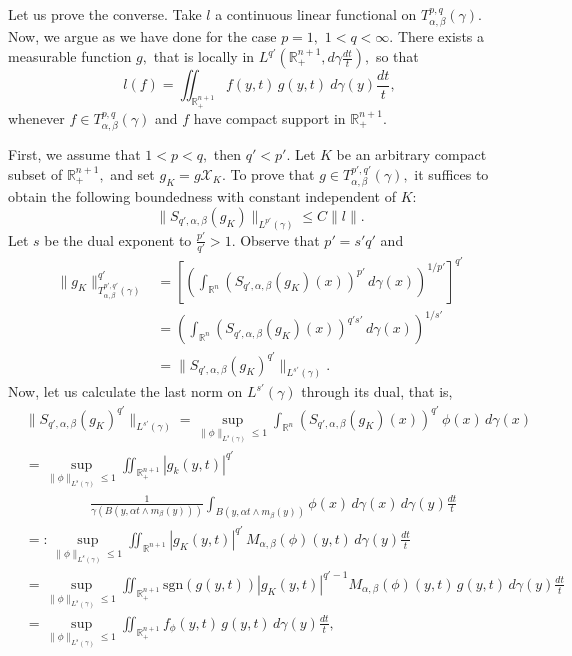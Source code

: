 \documentclass[leqno,11pt]{amsart}
\theoremstyle{plain}
\theoremstyle{remark}
\begin{document}
{Let us prove the converse.  Take $l$ a continuous linear functional on $T^{p,q}_{\alpha,\beta}(\gamma).$ Now, we argue as we have done for the case $p=1,$ $1<q<\infty.$ There exists a measurable function $g,$ that is locally in $L^{q'}(\mathbb{R}^{n+1}_+,d\gamma \frac{dt}{t}),$ so that \begin{equation}\label{formularepresentacion}
l(f)=\iint_{\mathbb{R}^{n+1}_+}f(y,t)\, g(y,t)\ d\gamma(y)\frac{dt}{t},
\end{equation}
whenever $f\in T^{p,q}_{\alpha, \beta}(\gamma)$ and $f$ have compact support in $\mathbb{R}^{n+1}_+.$ 

First, we assume that $1<p<q,$ then $q'<p'.$
Let $K$ be an arbitrary compact subset of $\mathbb{R}^{n+1}_+,$ and set $g_K=g\mathcal{X}_K.$ 
To prove that $g\in T^{p',q'}_{\alpha, \beta}(\gamma),$ it suffices to obtain the following boundedness with constant independent of $K$: \begin{equation}\label{acotacionTdual}
\|S_{q',\alpha,\beta}(g_K)\|_{L^{p'}(\gamma)}\le C \|l\|.
\end{equation}
 Let $s$ be the dual exponent to $\frac{p'}{q'}>1.$ %
 Observe that $p'=s' q'$ and
 \begin{align*}
\|g_K\|_{T^{p',q'}_{\alpha,\beta}(\gamma)}^{q'}&=\left[\left(\int_{\mathbb{R}^n}(S_{q',\alpha,\beta}(g_K)(x))^{p'} \, d\gamma(x)\right)^{1/{p'}}\right]^{q'}\\ & = \left(\int_{\mathbb{R}^n}(S_{q',\alpha, \beta}(g_K)(x))^{q's'}\, d\gamma(x)\right)^{1/{s'}}\\ &=\|S_{q',\alpha,\beta}(g_K)^{q'}\|_{L^{s'}(\gamma)}.
 \end{align*}
 Now, let us calculate the last norm on $L^{s'}(\gamma)$ through its dual, that is, 
 \begin{align*}
&\|S_{q',\alpha,\beta}(g_K)^{q'}\|_{L^{s'}(\gamma)}   = \underset{\|\phi\|_{L^{s}(\gamma)}\le 1}{\sup}\int_{\mathbb{R}^n}(S_{q',\alpha, \beta}(g_K)(x))^{q'}\, \phi(x)\, d\gamma(x)\\ &= \underset{\|\phi\|_{L^{s}(\gamma)}\le 1}{\sup}\iint_{\mathbb{R}^{n+1}_+}|g_k(y,t)|^{q'}\, \\ & \qquad \qquad \ \ \ \frac{1}{\gamma(B(y,\alpha t\wedge m_\beta(y)))}\int_{B(y, \alpha t\wedge m_\beta(y))} \phi(x)\, d\gamma(x)\, d\gamma(y)\frac{dt}{t}\\ &=: \underset{\|\phi\|_{L^{s}(\gamma)}\le 1}{\sup}\iint_{\mathbb{R}^{n+1}}|g_K(y,t)|^{q'}\, M_{\alpha, \beta}(\phi)(y,t)\, d\gamma(y)\frac{dt}{t}\\ &= \underset{\|\phi\|_{L^{s}(\gamma)}\le 1}{\sup} \iint_{\mathbb{R}^{n+1}_+} \mathrm{sgn} (g(y,t)) |g_K(y,t)|^{q'-1} M_{\alpha,\beta} (\phi)(y,t)\, g(y,t)\, d\gamma(y)\frac{dt}{t}\\ &= \underset{\|\phi\|_{L^{s}(\gamma)}\le 1}{\sup} \iint_{\mathbb{R}^{n+1}_+} f_\phi(y,t)\, g(y,t)\, d\gamma(y)\frac{dt}{t},

\end{align*}}
\end{document}
